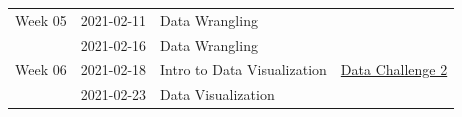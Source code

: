\documentclass[
]{book}
\begin{document}
\begin{longtable}[]{@{}llll@{}}
\begin{minipage}[t]{0.22\columnwidth}\raggedright
Week 05\strut
\end{minipage} & \begin{minipage}[t]{0.22\columnwidth}\raggedright
2021-02-11\strut
\end{minipage} & \begin{minipage}[t]{0.22\columnwidth}\raggedright
Data Wrangling\strut
\end{minipage} & \begin{minipage}[t]{0.22\columnwidth}\raggedright
\strut
\end{minipage}\tabularnewline
\begin{minipage}[t]{0.22\columnwidth}\raggedright
\strut
\end{minipage} & \begin{minipage}[t]{0.22\columnwidth}\raggedright
2021-02-16\strut
\end{minipage} & \begin{minipage}[t]{0.22\columnwidth}\raggedright
Data Wrangling\strut
\end{minipage} & \begin{minipage}[t]{0.22\columnwidth}\raggedright
\strut
\end{minipage}\tabularnewline
\begin{minipage}[t]{0.22\columnwidth}\raggedright
Week 06\strut
\end{minipage} & \begin{minipage}[t]{0.22\columnwidth}\raggedright
2021-02-18\strut
\end{minipage} & \begin{minipage}[t]{0.22\columnwidth}\raggedright
Intro to Data Visualization\strut
\end{minipage} & \begin{minipage}[t]{0.22\columnwidth}\raggedright
\href{https://classroom.github.com/a/h4Hgow-M}{Data Challenge 2}\strut
\end{minipage}\tabularnewline
\begin{minipage}[t]{0.22\columnwidth}\raggedright
\strut
\end{minipage} & \begin{minipage}[t]{0.22\columnwidth}\raggedright
2021-02-23\strut
\end{minipage} & \begin{minipage}[t]{0.22\columnwidth}\raggedright
Data Visualization\strut
\end{minipage} & \begin{minipage}[t]{0.22\columnwidth}\raggedright

\end{minipage}
\end{longtable}
\end{document}
